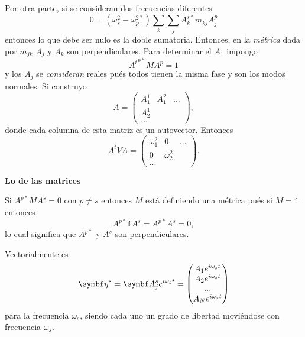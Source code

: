 \documentclass[10pt,oneside]{CBFT_book}
\begin{document}
Por otra parte, si se consideran dos frecuencias diferentes
\[
	0 = ( \omega^2_s - \omega^{2*}_p ) \sum_k \sum_j  A_k^{s*} m_{kj} A_j^{p}
\]
entonces lo que debe ser nulo es la doble sumatoria. Entonces, en la {\it métrica} dada por $m_{jk}$ $A_j$ y $A_k$
son perpendiculares.
Para determinar el $A_1$ impongo
\[
	{A^t}^{p*} M A^p = 1
\]
y los $A_j$ se {\it consideran} reales pués todos tienen la misma fase y son los modos normales.
Si construyo
\[
	A = \begin{pmatrix}
	A_1^1 & A_1^2 & ... \\
	A_2^1 &       &      \\
	...
	\end{pmatrix},
\]
donde cada columna de esta matriz es un autovector. Entonces
\[
	A^t V A = \begin{pmatrix}
	\omega_1^2 & 0 & ... \\
	0 &  \omega_2^2  &      \\
	...
	\end{pmatrix}.
\]

\begin{ejemplo}{\bf Lo de las matrices}

Si $ A^{p*} M A^s =0 $ con $ p \neq s $ entonces $M$ está definiendo una métrica pués si $ M = \mathbb{1} $ entonces
\[
	A^{p*} \mathbb{1} A^s = A^{p*} A^s = 0,
\]
lo cual significa que $A^{p*}$ y $ A^s$ son perpendiculares.
 
\end{ejemplo}


Vectorialmente es 
\[
	\vb{\eta}^s = \vb{A}_j^s e^{i\omega_s t} = \begin{pmatrix}
	                A_1 e^{i\omega_s t} \\
	                A_2 e^{i\omega_s t} \\
	                ... \\
	                A_N e^{i\omega_s t} \\
	               \end{pmatrix}
\]
para la frecuencia $\omega_s$, siendo cada uno un grado de libertad moviéndose con frecuencia $\omega_s$.
\end{document}
